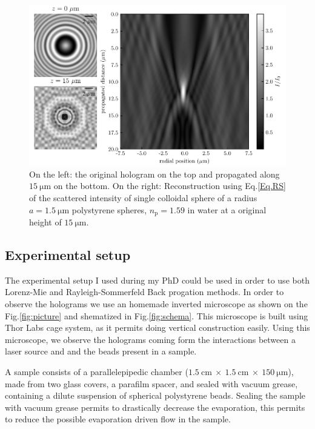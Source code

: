 \begin{figure}[!ht]
	\centering
	\includegraphics{02_body/chapter2/images/Back-propagation/backpropagation.pdf}
	\caption{On the left: the original hologram on the top and propagated along $15 ~ \mathrm{\mu m}$ on the bottom. On the right: Reconstruction using Eq.\ref{Eq.RS} of the scattered intensity of single colloidal sphere of a radius $a = 1.5 ~ \mathrm{\mu m}$  polystyrene spheres, $n_\mathrm{p} = 1.59$ in water at a original height of $15 ~ \mathrm{\mu m}$. }
	\label{fig.sommerfeld}
\end{figure}




\subsection{Experimental setup}
\label{chap:exp-setup}

The experimental setup I used during my PhD could be used in order to use both Lorenz-Mie and Rayleigh-Sommerfeld Back progation methods. In order to observe the holograms we use an homemade inverted microscope as shown on the Fig.\ref{fig:picture} and shematized in Fig.\ref{fig:schema}. This microscope is built using Thor Labs cage system, as it permits doing vertical construction easily. Using this microscope, we observe the holograms coming form the interactions between a laser source and and the beads present in a sample.

A sample consists of a parallelepipedic chamber ($1.5 ~ \text{cm} ~ \times ~ 1.5 ~ \text{cm} ~ \times ~ 150 ~ \mathrm{\mu m} $), made from two glass covers, a parafilm spacer, and sealed with vacuum grease, containing a dilute suspension of spherical polystyrene beads. Sealing the sample with vacuum grease permits to drastically decrease the evaporation, this permits to reduce the possible evaporation driven flow in the sample.

